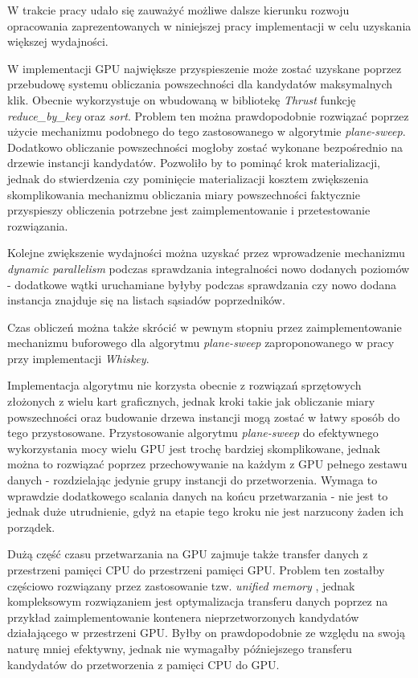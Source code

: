 \documentclass[12pt]{article}
\begin{document}
W trakcie pracy udało się zauważyć możliwe dalsze kierunku rozwoju opracowania zaprezentowanych w niniejszej pracy implementacji w celu uzyskania większej wydajności.

W implementacji GPU największe przyspieszenie może zostać uzyskane poprzez przebudowę systemu obliczania powszechności dla kandydatów maksymalnych klik. Obecnie wykorzystuje on wbudowaną w bibliotekę \textit{Thrust} funkcję \textit{reduce\_by\_key} oraz \textit{sort}. Problem ten można prawdopodobnie rozwiązać poprzez użycie mechanizmu podobnego do tego zastosowanego w algorytmie \textit{plane-sweep}. Dodatkowo obliczanie powszechności mogłoby zostać wykonane bezpośrednio na drzewie instancji kandydatów. Pozwoliło by to pominąć krok materializacji, jednak do stwierdzenia czy pominięcie materializacji kosztem zwiększenia skomplikowania mechanizmu obliczania miary powszechności faktycznie przyspieszy obliczenia potrzebne jest zaimplementowanie i przetestowanie rozwiązania. 

Kolejne zwiększenie wydajności można uzyskać przez wprowadzenie mechanizmu \textit{dynamic parallelism} \cite{cuda_dp} podczas sprawdzania integralności nowo dodanych poziomów - dodatkowe wątki uruchamiane byłyby podczas sprawdzania czy nowo dodana instancja znajduje się na listach sąsiadów poprzedników.

Czas obliczeń można także skrócić w pewnym stopniu przez zaimplementowanie mechanizmu buforowego dla algorytmu \textit{plane-sweep} zaproponowanego w pracy \cite{plane2} przy implementacji \textit{Whiskey}.

Implementacja algorytmu nie korzysta obecnie z rozwiązań sprzętowych złożonych z wielu kart graficznych, jednak kroki takie jak obliczanie miary powszechności oraz budowanie drzewa instancji mogą zostać w łatwy sposób do tego przystosowane. Przystosowanie algorytmu \textit{plane-sweep} do efektywnego wykorzystania mocy wielu GPU jest trochę bardziej skomplikowane, jednak można to rozwiązać poprzez przechowywanie na każdym z GPU pełnego zestawu danych - rozdzielając jedynie grupy instancji do przetworzenia. Wymaga to wprawdzie dodatkowego scalania danych na końcu przetwarzania - nie jest to jednak duże utrudnienie, gdyż na etapie tego kroku nie jest narzucony żaden ich porządek.

Dużą część czasu przetwarzania na GPU zajmuje także transfer danych z przestrzeni pamięci CPU do przestrzeni pamięci GPU. Problem ten zostałby częściowo rozwiązany przez zastosowanie tzw. \textit{unified memory} \cite{cuda_um}, jednak kompleksowym rozwiązaniem jest optymalizacja transferu danych poprzez na przykład zaimplementowanie kontenera nieprzetworzonych kandydatów działającego w przestrzeni GPU. Byłby on prawdopodobnie ze względu na swoją naturę mniej efektywny, jednak nie wymagałby późniejszego transferu kandydatów do przetworzenia z pamięci CPU do GPU.
\end{document}
